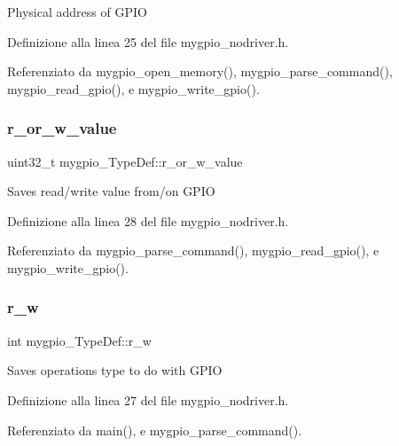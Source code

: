Physical address of G\+P\+IO 

Definizione alla linea 25 del file mygpio\+\_\+nodriver.\+h.



Referenziato da mygpio\+\_\+open\+\_\+memory(), mygpio\+\_\+parse\+\_\+command(), mygpio\+\_\+read\+\_\+gpio(), e mygpio\+\_\+write\+\_\+gpio().

\mbox{\label{structmygpio___type_def_aab3573a0ca458b76823e4f573eddff10}} 
\subsubsection{\texorpdfstring{r\+\_\+or\+\_\+w\+\_\+value}{r\_or\_w\_value}}
{\footnotesize\ttfamily uint32\+\_\+t mygpio\+\_\+\+Type\+Def\+::r\+\_\+or\+\_\+w\+\_\+value}

Saves read/write value from/on G\+P\+IO 

Definizione alla linea 28 del file mygpio\+\_\+nodriver.\+h.



Referenziato da mygpio\+\_\+parse\+\_\+command(), mygpio\+\_\+read\+\_\+gpio(), e mygpio\+\_\+write\+\_\+gpio().

\mbox{\label{structmygpio___type_def_ad380cd40cc8cd86e745f5f14eca7cb44}} 
\subsubsection{\texorpdfstring{r\+\_\+w}{r\_w}}
{\footnotesize\ttfamily int mygpio\+\_\+\+Type\+Def\+::r\+\_\+w}

Saves operation\textquotesingle{}s type to do with G\+P\+IO 

Definizione alla linea 27 del file mygpio\+\_\+nodriver.\+h.



Referenziato da main(), e mygpio\+\_\+parse\+\_\+command().

\mbox{\label{structmygpio___type_def_a40667a00b61db1a77198255f02f25fe9}} 
